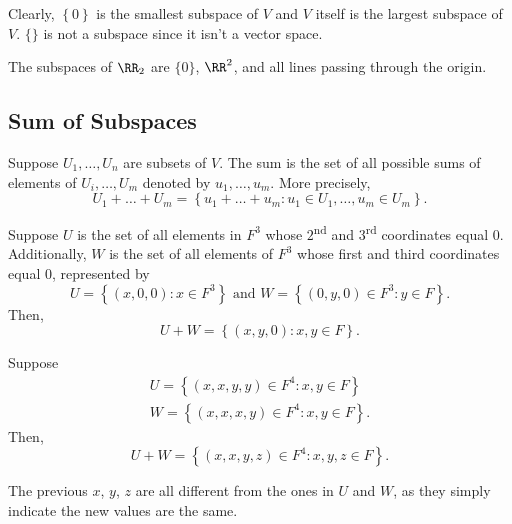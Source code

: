 Clearly, $\left\{0\right\}$ is the smallest subspace of $V$ and $V$ itself is the largest subspace of $V$. 
$\{\}$ is not a subspace since it isn't a vector space.

The subspaces of $\RR_{2}$ are $\{0\}$, $\RR^{2}$, and all lines passing through the origin.

\subsection{Sum of Subspaces}

\begin{definition}
  Suppose $U_{1}, \dots, U_{n}$ are subsets of $V$. 
  The sum is the set of all possible sums of elements of $U_{i}, \dots, U_{m}$ denoted by $u_{1}, \dots, u_{m}$. More precisely,
  \begin{equation*}
    U_{1} + \dots + U_{m} = \left\{u_{1} + \dots + u_{m} : u_{1} \in U_{1}, \dots, u_{m} \in U_{m}\right\}.
  \end{equation*}
\end{definition}

\begin{example}
  Suppose $U$ is the set of all elements in $F^{3}$ whose $2$\textsuperscript{nd} and $3$\textsuperscript{rd} coordinates equal $0$.
  Additionally, $W$ is the set of all elements of $F^{3}$ whose first and third coordinates equal $0$, represented by
  \begin{equation*}
    U = \left\{(x, 0, 0) : x \in F^{3}\right\} \text{ and } W = \left\{(0, y, 0) \in F^{3} : y \in F\right\}.
  \end{equation*}
  Then, 
  \begin{equation*}
    U + W = \left\{(x, y, 0) : x, y \in F\right\}.
  \end{equation*}
\end{example}

\begin{example}
  Suppose 
  \begin{gather*}
    U = \left\{(x, x, y, y) \in F^{4} : x, y \in F\right\} \\
    W = \left\{(x, x, x, y) \in F^{4} : x, y \in F\right\}.
  \end{gather*}
  Then, 
  \begin{equation*}
    U + W = \left\{(x, x, y, z) \in F^{4} : x, y, z \in F\right\}.
  \end{equation*}
\end{example}

\begin{remark}
  The previous $x$, $y$, $z$ are all different from the ones in $U$ and $W$, as they simply indicate the new values are the same.
\end{remark}

